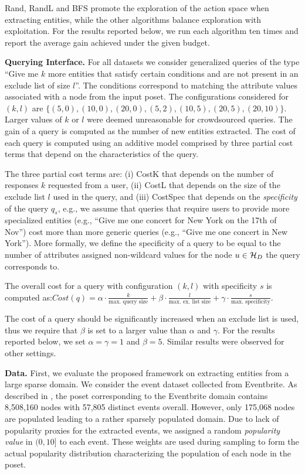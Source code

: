 Rand, RandL and BFS promote the exploration of the action space when extracting entities, while the other algorithms balance exploration with exploitation. For the results reported below, we run each algorithm ten times and report the average gain achieved under the given budget.

\vspace{2pt}\noindent\textbf{Querying Interface.} For all datasets we consider generalized queries of the type ``Give me $k$ more entities that satisfy certain conditions and are not present in an exclude list of size $l$''. The conditions correspond to matching the attribute values associated with a node from the input poset. The  configurations considered for $(k,l)$ are {\small $\{(5,0), (10,0), (20,0), (5,2), (10,5), (20,5), (20,10)\}$}. Larger values of $k$ or $l$ were deemed unreasonable for crowdsourced queries. The gain of a query is computed as the number of new entities extracted. The cost of each query is computed using an additive model comprised by three partial cost terms that depend on the characteristics of the query. 

The three partial cost terms are: (i) {\sf CostK} that depends on the number of responses $k$ requested from a user, (ii) {\sf CostL} that depends on the size of the exclude list $l$ used in the query, and (iii) {\sf CostSpec} that depends on the {\em specificity} of the query $q_s$, e.g., we assume that queries that require users to provide more specialized entities (e.g., ``Give me one concert for New York on the 17th of Nov'') cost more than more generic queries (e.g.,  ``Give me one concert in New York''). More formally, we define the specificity of a query to be equal to the number of attributes assigned non-wildcard values for the node $u \in \mathcal{H}_D$ the query corresponds to. 

The overall cost for a query with configuration $(k,l)$ with specificity $s$ is computed as:{\scriptsize $Cost(q) = \alpha \cdot \frac{k}{\mbox{max. query size}} + \beta \cdot  \frac{l}{\mbox{max. ex. list size}} + \gamma \cdot  \frac{s}{\mbox{max. specificity}} $}.

The cost of a query should be significantly increased when an exclude list is used, thus we require that $\beta$ is set to a larger value than $\alpha$ and $\gamma$. For the results reported below, we set $\alpha = \gamma = 1$ and $\beta = 5$. Similar results were observed for other settings.

\vspace{2pt}\noindent\textbf{Data.} First, we evaluate the proposed framework on extracting entities from a large sparse domain. We consider the event dataset collected from Eventbrite. As described in , the poset corresponding to the Eventbrite domain contains 8,508,160 nodes with 57,805 distinct events overall. However, only 175,068 nodes are populated leading to a rather sparsely populated domain. Due to lack of popularity proxies for the extracted events, we assigned a random {\em popularity value} in $(0,10]$ to each event. These weights are used during sampling to form the actual popularity distribution characterizing the population of each node in the poset. 

